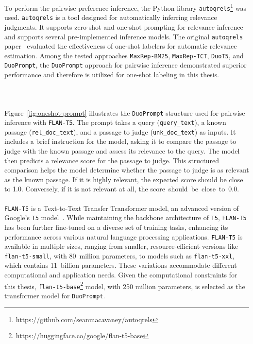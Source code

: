 \noindent To perform the pairwise preference inference, the Python library \texttt{autoqrels}\footnote{https://github.com/seanmacavaney/autoqrels} was used. \texttt{autoqrels} is a tool designed for automatically inferring relevance judgments. It supports zero-shot and one-shot prompting for relevance inference and supports several pre-implemented inference models. The original \texttt{autoqrels} paper~\citep{macavaney:2023} evaluated the effectiveness of one-shot labelers for automatic relevance estimation. Among the tested approaches \texttt{MaxRep-BM25}, \texttt{MaxRep-TCT}, \texttt{DuoT5}, and \texttt{DuoPrompt}, the \texttt{DuoPrompt} approach for pairwise inference demonstrated superior performance and therefore is utilized for one-shot labeling in this thesis.
\\\\\\\\
Figure~\ref{fig:oneshot-prompt} illustrates the \texttt{DuoPrompt} structure used for pairwise inference with \texttt{FLAN-T5}. The prompt takes a query (\texttt{query\_text}), a known passage (\texttt{rel\_doc\_text}), and a passage to judge (\texttt{unk\_doc\_text}) as inputs. It includes a brief instruction for the model, asking it to compare the passage to judge with the known passage and assess its relevance to the query. The model then predicts a relevance score for the passage to judge. This structured comparison helps the model determine whether the passage to judge is as relevant as the known passage. If it is highly relevant, the expected score should be close to 1.0. Conversely, if it is not relevant at all, the \mbox{score should be close to 0.0}.
\\\\
\texttt{FLAN-T5} is a Text-to-Text Transfer Transformer model, an advanced version of Google's \texttt{T5} model~\citep{raffel:2020}. While maintaining the backbone architecture of \texttt{T5}, \texttt{FLAN-T5} has been further fine-tuned on a diverse set of training tasks, enhancing its performance across various natural language processing applications. \texttt{FLAN-T5} is available in multiple sizes, ranging from smaller, resource-efficient versions like \texttt{flan-t5-small}, with 80~million parameters, to models such as \texttt{flan-t5-xxl}, which contains 11~billion parameters. These variations accommodate different computational and application needs. Given the computational constraints for this thesis, \texttt{flan-t5-base}\footnote{https://huggingface.co/google/flan-t5-base} model, with 250 \mbox{million} parameters, is selected as the transformer model for \texttt{DuoPrompt}.
